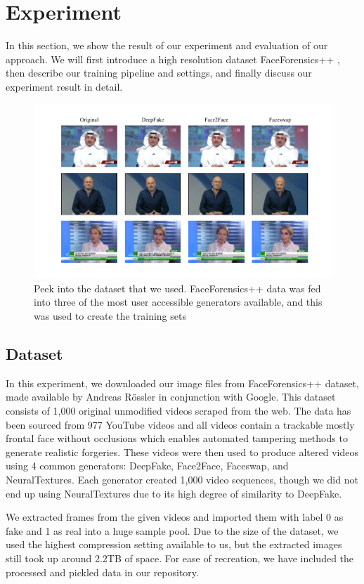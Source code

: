 \documentclass[11pt,twocolumn,letterpaper]{article}
\begin{document}
\section{Experiment}
In this section, we show the result of our experiment and evaluation of our approach. We will first introduce a high resolution dataset FaceForensics++ \cite{rssler2019faceforensics}, then describe our training pipeline and settings, and finally discuss our experiment result in detail. 

\begin{figure}
    \includegraphics[width=\textwidth]{example-data}
    \caption{Peek into the dataset that we used. FaceForensics++ data was fed into three of the most user accessible generators available, and this was used to create the training sets}
    \label{fig:dataset}
\end{figure} 
\subsection{Dataset}
In this experiment, we downloaded our image files from FaceForensics++ dataset, made available by Andreas Rössler in conjunction with Google. This dataset consists of 1,000 original unmodified videos scraped from the web. The data has been sourced from 977 YouTube videos and all videos contain a trackable mostly frontal face without occlusions which enables automated tampering methods to generate realistic forgeries. These videos were then used to produce altered videos using 4 common generators: DeepFake, Face2Face, Faceswap, and NeuralTextures. Each generator created 1,000 video sequences, though we did not end up using NeuralTextures due to its high degree of similarity to DeepFake.\par
We extracted frames from the given videos and imported them with label 0 as fake and 1 as real into a huge sample pool. Due to the size of the dataset, we used the highest compression setting available to us, but the extracted images still took up around 2.2TB of space. For ease of recreation, we have included the processed and pickled data in our repository.
\end{document}
